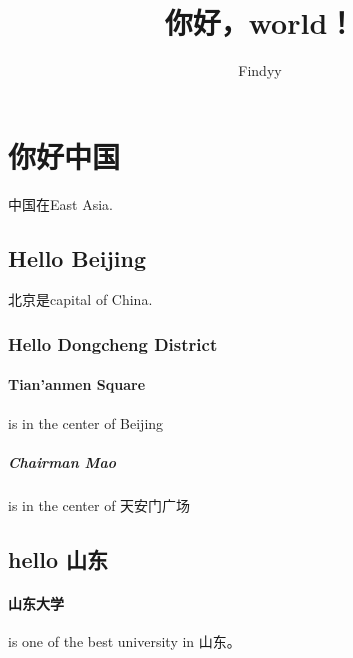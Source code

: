 \documentclass[UTF-8]{ctexart}
\title{你好，world！}
\author{Findyy}
\begin{document}
\tableofcontents
\maketitle
    \section{你好中国}
    中国在East Asia.
    \subsection{Hello Beijing}
    北京是capital of China.
    \subsubsection{Hello Dongcheng District}
    \paragraph{Tian'anmen Square}
    is in the center of Beijing
    \subparagraph{Chairman Mao}
    is in the center of 天安门广场
    \subsection{hello 山东}
    \paragraph{山东大学} is one of the best university in 山东。
\end{document}
